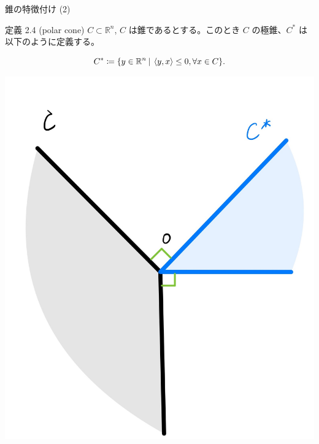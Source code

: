 \documentclass[aspectratio=169, dvipdfmx, 11pt]{beamer} %
\begin{document}
\begin{frame}{錐の特徴付け (2)}
  \begin{block}{定義 2.4 (polar cone) }
    $C \subset \mathbb{R}^n$, $C$ は錐であるとする。このとき $C$ の極錐、$C^*$ は以下のように定義する。

    \begin{equation}
      C^* \coloneqq \{y \in \mathbb{R}^n \:|\: \left\langle y,x \right\rangle \leq 0 , \forall x \in C \}. \notag
    \end{equation}

  \end{block}
  \centering
  \includegraphics[keepaspectratio, scale=0.06]{figures/polar_cone.jpg}
\end{frame}
\end{document}
